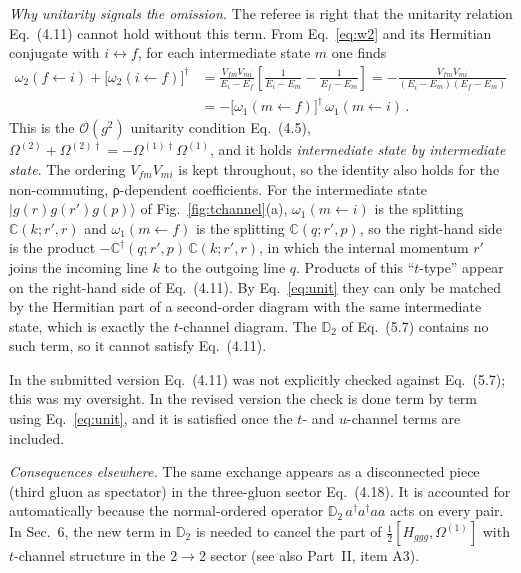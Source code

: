 \documentclass[11pt,a4paper]{article}
\newcommand{\Hggg}{H_{ggg}}
\newcommand{\eq}[1]{Eq.~(#1)}
\begin{document}
\emph{Why unitarity signals the omission.} The referee is right that the unitarity relation \eq{4.11} cannot hold without this term. From Eq.~\eqref{eq:w2} and its Hermitian conjugate with $i\leftrightarrow f$, for each intermediate state $m$ one finds
\begin{align}
\omega_2(f\!\leftarrow\! i)+\big[\omega_2(i\!\leftarrow\! f)\big]^\dagger
&=\frac{V_{fm}V_{mi}}{E_i-E_f}\left[\frac{1}{E_i-E_m}-\frac{1}{E_f-E_m}\right]
=-\frac{V_{fm}V_{mi}}{(E_i-E_m)(E_f-E_m)}\nonumber\\
&=-\big[\omega_1(m\!\leftarrow\! f)\big]^\dagger\,\omega_1(m\!\leftarrow\! i)\,.
\label{eq:unit}
\end{align}
This is the $\mathcal O(g^2)$ unitarity condition \eq{4.5}, $\Omega^{(2)}+\Omega^{(2)\dagger}=-\Omega^{(1)\dagger}\Omega^{(1)}$, and it holds \emph{intermediate state by intermediate state}. The ordering $V_{fm}V_{mi}$ is kept throughout, so the identity also holds for the non-commuting, ρ-dependent coefficients. For the intermediate state $|g(r)g(r')g(p)\rangle$ of Fig.~\ref{fig:tchannel}(a), $\omega_1(m\!\leftarrow\! i)$ is the splitting $\mathbb C(k;r',r)$ and $\omega_1(m\!\leftarrow\! f)$ is the splitting $\mathbb C(q;r',p)$, so the right-hand side is the product $-\mathbb C^\dagger(q;r',p)\,\mathbb C(k;r',r)$, in which the internal momentum $r'$ joins the incoming line $k$ to the outgoing line $q$. Products of this ``$t$-type'' appear on the right-hand side of \eq{4.11}. By Eq.~\eqref{eq:unit} they can only be matched by the Hermitian part of a second-order diagram with the same intermediate state, which is exactly the $t$-channel diagram. The $\mathbb D_2$ of \eq{5.7} contains no such term, so it cannot satisfy \eq{4.11}.

In the submitted version \eq{4.11} was not explicitly checked against \eq{5.7}; this was my oversight. In the revised version the check is done term by term using Eq.~\eqref{eq:unit}, and it is satisfied once the $t$- and $u$-channel terms are included.

\emph{Consequences elsewhere.} The same exchange appears as a disconnected piece (third gluon as spectator) in the three-gluon sector \eq{4.18}. It is accounted for automatically because the normal-ordered operator $\mathbb D_2\,a^\dagger a^\dagger a a$ acts on every pair. In Sec.~6, the new term in $\mathbb D_2$ is needed to cancel the part of $\tfrac12[\Hggg,\Omega^{(1)}]$ with $t$-channel structure in the $2\to2$ sector (see also Part~II, item A3).
\end{document}
